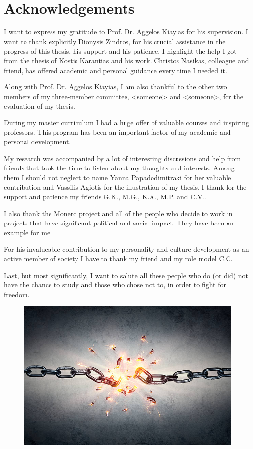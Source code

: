 \chapter*{Acknowledgements}
I want to express my gratitude to Prof. Dr. Aggelos Kiayias for his supervision. I want to thank explicitly Dionysis Zindros, for his crucial assistance in the progress of this thesis, his support and his patience. I highlight the help I got from the thesis of Kostis Karantias and his work. Christos Nasikas, colleague and friend, has offered academic and personal guidance every time I needed it.

Along with Prof. Dr. Aggelos Kiayias, I am also thankful to the other two members of my three-member committee, <someone> and <someone>, for the evaluation of my thesis.

During my master curriculum I had a huge offer of valuable courses and inspiring professors. This program has been an important factor of my academic and personal development.

My research was accompanied by a lot of interesting discussions and help from friends that took the time to listen about my thoughts and interests. Among them I should not neglect to name Yanna Papadodimitraki for her valuable contribution and Vassilis Agiotis for the illustration of my thesis. I thank for the support and patience my friends G.K., M.G., K.A., M.P. and C.V..

I also thank the Monero project and all of the people who decide to work in projects that have significant political and social impact. They have been an example for me.

For his invalueable contribution to my personality and culture development as an active member of society I have to thank my friend and my role model C.C.

Last, but most significantly, I want to salute all these people who do (or did) not have the chance to study and those who chose not to, in order to fight for freedom.
\vspace{0.4cm}
\begin{figure}[H]
  \centering
  \includegraphics[scale=0.26,keepaspectratio]{Images/Acknowledgements/broken-chain.jpg}
\end{figure}
%
